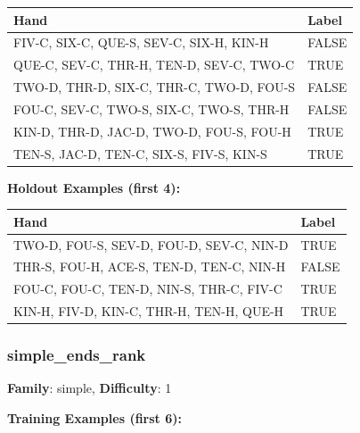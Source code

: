 \documentclass[10pt,a4paper]{article}
\begin{document}
\begin{small}
\begin{tabular}{p{8cm}l}
\toprule
Hand & Label \\
\midrule
FIV-C, SIX-C, QUE-S, SEV-C, SIX-H, KIN-H & \textcolor{negative}{FALSE} \\
QUE-C, SEV-C, THR-H, TEN-D, SEV-C, TWO-C & \textcolor{positive}{TRUE} \\
TWO-D, THR-D, SIX-C, THR-C, TWO-D, FOU-S & \textcolor{negative}{FALSE} \\
FOU-C, SEV-C, TWO-S, SIX-C, TWO-S, THR-H & \textcolor{negative}{FALSE} \\
KIN-D, THR-D, JAC-D, TWO-D, FOU-S, FOU-H & \textcolor{positive}{TRUE} \\
TEN-S, JAC-D, TEN-C, SIX-S, FIV-S, KIN-S & \textcolor{positive}{TRUE} \\
\bottomrule
\end{tabular}
\end{small}

\textbf{Holdout Examples (first 4):}

\begin{small}
\begin{tabular}{p{8cm}l}
\toprule
Hand & Label \\
\midrule
TWO-D, FOU-S, SEV-D, FOU-D, SEV-C, NIN-D & \textcolor{positive}{TRUE} \\
THR-S, FOU-H, ACE-S, TEN-D, TEN-C, NIN-H & \textcolor{negative}{FALSE} \\
FOU-C, FOU-C, TEN-D, NIN-S, THR-C, FIV-C & \textcolor{positive}{TRUE} \\
KIN-H, FIV-D, KIN-C, THR-H, TEN-H, QUE-H & \textcolor{positive}{TRUE} \\
\bottomrule
\end{tabular}
\end{small}

\vspace{0.5cm}

\subsubsection{simple\_ends\_rank}

\textbf{Family}: simple, \textbf{Difficulty}: 1

\textbf{Training Examples (first 6):}
\end{document}

